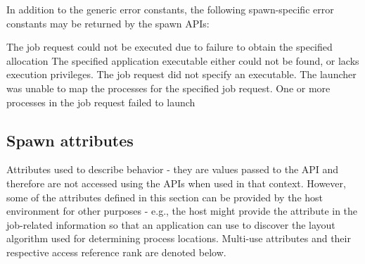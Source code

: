 In addition to the generic error constants, the following spawn-specific error constants may be returned by the spawn \acp{API}:

\begin{constantdesc}
%
The job request could not be executed due to failure to obtain the specified allocation
%
The specified application executable either could not be found, or lacks execution privileges.
%
The job request did not specify an executable.
%
The launcher was unable to map the processes for the specified job request.
%
One or more processes in the job request failed to launch
%
\end{constantdesc}

\subsection{Spawn attributes}
\label{api:struct:attributes:spawn}

Attributes used to describe  behavior - they are values passed to the  \ac{API} and therefore are not accessed using the  \acp{API} when used in that context. However, some of the attributes defined in this section can be provided by the host environment for other purposes - e.g., the host might provide the  attribute in the job-related information so that an application can use  to discover the layout algorithm used for determining process locations. Multi-use attributes and their respective access reference rank are denoted below.

